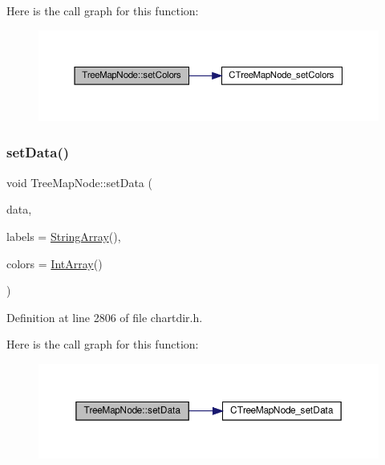 Here is the call graph for this function\+:
\nopagebreak
\begin{figure}[H]
\begin{center}
\leavevmode
\includegraphics[width=350pt]{class_tree_map_node_a63211696a930a3e71bb36b1b8da09ed7_cgraph}
\end{center}
\end{figure}
\mbox{\label{class_tree_map_node_a528e9fc0b6dc1a860a48a28eb399621d}} 
\subsubsection{\texorpdfstring{set\+Data()}{setData()}}
{\footnotesize\ttfamily void Tree\+Map\+Node\+::set\+Data (\begin{DoxyParamCaption}\item[{\hyperlink{class_double_array}{Double\+Array}}]{data,  }\item[{\hyperlink{class_string_array}{String\+Array}}]{labels = {\ttfamily \hyperlink{class_string_array}{String\+Array}()},  }\item[{\hyperlink{class_int_array}{Int\+Array}}]{colors = {\ttfamily \hyperlink{class_int_array}{Int\+Array}()} }\end{DoxyParamCaption})\hspace{0.3cm}{\ttfamily [inline]}}



Definition at line 2806 of file chartdir.\+h.

Here is the call graph for this function\+:
\nopagebreak
\begin{figure}[H]
\begin{center}
\leavevmode
\includegraphics[width=350pt]{class_tree_map_node_a528e9fc0b6dc1a860a48a28eb399621d_cgraph}
\end{center}
\end{figure}
\mbox{\label{class_tree_map_node_ae8ca68707b6ed67384a109d8058a2c97}} 
